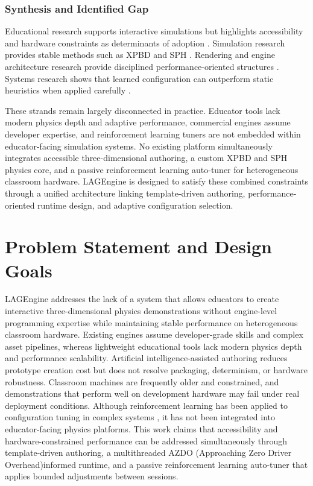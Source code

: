 \documentclass[9pt,openany]{extbook}
\begin{document}
\subsection{Synthesis and Identified Gap}

Educational research supports interactive simulations but highlights accessibility and hardware constraints as determinants of adoption \cite{wieman2008phet, rutten2012learning, an2016games, kaimara2021dgbla}. Simulation research provides stable methods such as XPBD and SPH \cite{muller2007pbd, macklin2016xpbd, muller2003sph}. Rendering and engine architecture research provide disciplined performance-oriented structures \cite{cook1982, wihlidal2017, gregory2018}. Systems research shows that learned configuration can outperform static heuristics when applied carefully \cite{ottertune2017, ppo}.

These strands remain largely disconnected in practice. Educator tools lack modern physics depth and adaptive performance, commercial engines assume developer expertise, and reinforcement learning tuners are not embedded within educator-facing simulation systems. No existing platform simultaneously integrates accessible three-dimensional authoring, a custom XPBD and SPH physics core, and a passive reinforcement learning auto-tuner for heterogeneous classroom hardware. LAGEngine is designed to satisfy these combined constraints through a unified architecture linking template-driven authoring, performance-oriented runtime design, and adaptive configuration selection.
\chapter{Problem Statement and Design Goals}

LAGEngine addresses the lack of a system that allows educators to create interactive three-dimensional physics demonstrations without engine-level programming expertise while maintaining stable performance on heterogeneous classroom hardware. Existing engines assume developer-grade skills and complex asset pipelines, whereas lightweight educational tools lack modern physics depth and performance scalability. Artificial intelligence-assisted authoring reduces prototype creation cost \cite{benzion2025ai} but does not resolve packaging, determinism, or hardware robustness. Classroom machines are frequently older and constrained, and demonstrations that perform well on development hardware may fail under real deployment conditions. Although reinforcement learning has been applied to configuration tuning in complex systems \cite{li2023athena}, it has not been integrated into educator-facing physics platforms. This work claims that accessibility and hardware-constrained performance can be addressed simultaneously through template-driven authoring, a multithreaded AZDO (Approaching Zero Driver Overhead)informed runtime, and a passive reinforcement learning auto-tuner that applies bounded adjustments between sessions.
\end{document}
